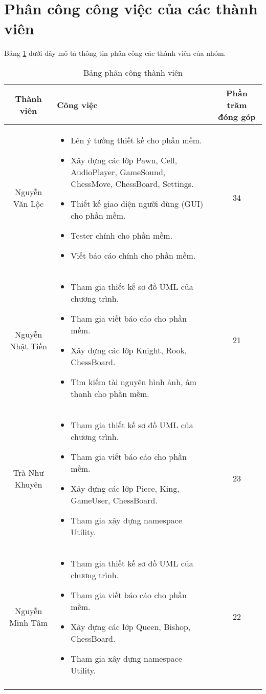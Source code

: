 \section{Phân công công việc của các thành viên}
Bảng \ref{jobs} dưới đây mô tả thông tin phân công các thành viên của nhóm.
\begin{longtable}{|c| p{}|c|} 
\hline 
Thành viên & Công việc & Phần trăm đóng góp \\ 
\hline 
Nguyễn Văn Lộc & \begin{itemize}
\item Lên ý tưởng thiết kế cho phần mềm.
\item Xây dựng các lớp Pawn, Cell, AudioPlayer, GameSound, ChessMove, ChessBoard, Settings.
\item Thiết kế giao diện người dùng (GUI) cho phần mềm.
\item Tester chính cho phần mềm.
\item Viết báo cáo chính cho phần mềm.
\end{itemize} & 34 \\ 
\hline 
Nguyễn Nhật Tiến & \begin{itemize}
\item Tham gia thiết kế sơ đồ UML của chương trình.
\item Tham gia viết báo cáo cho phần mềm.
\item Xây dựng các lớp Knight, Rook, ChessBoard.
\item Tìm kiếm tài nguyên hình ảnh, âm thanh cho phần mềm.
\end{itemize} & 21 \\ 
\hline 
Trà Như Khuyên & \begin{itemize}
\item Tham gia thiết kế sơ đồ UML của chương trình.
\item Tham gia viết báo cáo cho phần mềm.
\item Xây dựng các lớp Piece, King, GameUser, ChessBoard. \item Tham gia xây dựng namespace Utility.
\end{itemize} & 23 \\ 
\hline 
Nguyễn Minh Tâm & \begin{itemize}
\item Tham gia thiết kế sơ đồ UML của chương trình.
\item Tham gia viết báo cáo cho phần mềm.
\item Xây dựng các lớp Queen, Bishop, ChessBoard.
\item Tham gia xây dựng namespace Utility.
\end{itemize} & 22 \\ 
\hline 
\caption{Bảng phân công thành viên}
\label{jobs}
\end{longtable} 